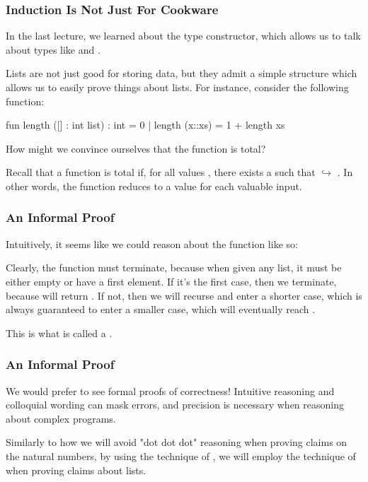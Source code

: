 \documentclass[aspectratio=169]{beamer}
\begin{document}
\begin{frame}[fragile]
  \frametitle{Induction Is Not Just For Cookware}

  In the last lecture, we learned about the  type constructor, which allows us
  to talk about types like  and .

  \vspace{\fill}

  Lists are not just good for storing data, but they admit a simple structure which allows 
  us to easily prove things about lists. For instance, consider the following function:

  \begin{codeblock}
    fun length ([] : int list) : int = 0
      | length (x::xs) = 1 + length xs
  \end{codeblock}

  How might we convince ourselves that the  function is total?

  \vspace{\fill}

  Recall that a function  is total if, for all values , there exists a
   such that  $\hookrightarrow$ . In other words, the function 
  reduces to a value for each valuable input.
\end{frame}

\begin{frame}[fragile]
  \frametitle{An Informal Proof}

  Intuitively, it seems like we could reason about the function like so:

  \vspace{\fill}

  Clearly, the function  must terminate, because when given any list, 
  it must be either empty or have a first element. If it's the first case, then we 
  terminate, because  will return . If not, then we will recurse
  and enter a shorter case, which is always guaranteed to enter a smaller case, which
  will eventually reach \code{[]}. 

  \vspace{\fill}

  This is what is called a . 
\end{frame}

\begin{frame}[fragile]
  \frametitle{An Informal Proof}

  We would prefer to see formal proofs of correctness! Intuitive reasoning and 
  colloquial wording can mask errors, and precision is necessary when reasoning 
  about complex programs.

  \vspace{\fill}

  Similarly to how we will avoid "dot dot dot" reasoning when proving claims 
  on the natural numbers, by using the technique of ,
  we will employ the technique of  when proving claims
  about lists.
\end{frame}
\end{document}
